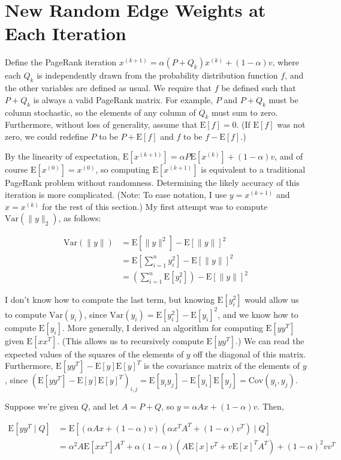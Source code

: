 \documentclass{article}
\newcommand \E[1] {\mathrm E \left[#1\right]} %
\newcommand \Var[1] {\mathrm {Var} \left(#1\right)} %
\newcommand \Cov[2] {\mathrm {Cov} (#1, #2)} %
\newcommand \vitr [2] {#1^{(#2)}} %
\begin{document}
\section{New Random Edge Weights at Each Iteration}

Define the PageRank iteration $\vitr x {k+1} =\alpha (P+Q_k)\vitr x k + (1-\alpha)v$, where each $Q_k$ is independently drawn from the probability distribution function $f$, and the other variables are defined as usual. We require that $f$ be defined such that $P+Q_k$ is always a valid PageRank matrix. For example, $P$ and $P+Q_k$ must be column stochastic, so the elements of any column of $Q_k$ must sum to zero. Furthermore, without loss of generality, assume that $\E f = 0$. (If $\E f$ was not zero, we could redefine $P$ to be $P+\E f$ and $f$ to be $f-\E f$.)

By the linearity of expectation, $\E {\vitr x {k+1}} = \alpha P \E{\vitr x k} + (1-\alpha)v$, and of course $\E {\vitr x 0} = \vitr x 0$, so computing $\E {\vitr x {k+1}}$ is equivalent to a traditional PageRank problem without randomness. Determining the likely accuracy of this iteration is more complicated. (Note: To ease notation, I use $y = \vitr x {k+1}$ and $x = \vitr x k$ for the rest of this section.)
My first attempt was to compute $\Var{\| y\|_2}$, as follows:

\begin{align*}
\Var{\|y\|} &= \E{\|y\|^2}-\E{\|y\|}^2\\
&= \E{\sum_{i=1}^n y_i^2}-\E{\|y\|}^2\\
&= \left(\sum_{i=1}^n \E{y_i^2}\right)-\E{\|y\|}^2
\end{align*}

I don't know how to compute the last term, but knowing $\E{y_i^2}$ would allow us to compute $\Var{y_i}$, since $\Var{y_i}=\E{y_i^2}-\E{y_i}^2$, and we know how to compute $\E{y_i}$. More generally, I derived an algorithm for computing $\E{yy^T}$ given $\E{xx^T}$. (This allows us to recursively compute $\E{yy^T}$.) We can read the expected values of the squares of the elements of $y$ off the diagonal of this matrix. Furthermore, $\E{yy^T}-\E{y}\E{y}^T$ is the covariance matrix of the elements of $y$, since $\left(\E{yy^T}-\E{y}\E{y}^T\right)_{i,j}=\E{y_iy_j}-\E{y_i}\E{y_j}=\Cov{y_i}{y_j}$.

Suppose we're given $Q$, and let $A=P+Q$, so $y=\alpha Ax + (1-\alpha)v$. Then,

\begin{align*}
\E{y y^T \mid Q} &= \E{\left(\alpha Ax+(1-\alpha)v\right) \left(\alpha x^T A^T+(1-\alpha)v^T\right) \mid Q} \\
&= \alpha^2 A\E{x x^T}A^T + \alpha(1-\alpha)(A \E x v^T + v {\E x}^T A^T )+ (1-\alpha)^2 vv^T
\end{align*}
\end{document}
